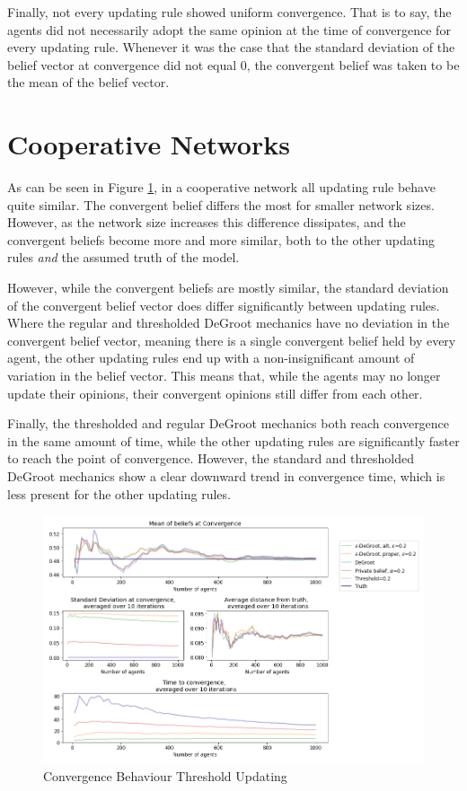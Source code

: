 \documentclass[a4paper, 12pt]{report}
\begin{document}
\noindent Finally, not every updating rule showed uniform convergence. That is to say, the agents did not necessarily adopt the same opinion at the time of convergence for every updating rule. Whenever it was the case that the standard deviation of the belief vector at convergence did not equal $0$, the convergent belief was taken to be the mean of the belief vector.

\section{Cooperative Networks}

As can be seen in Figure \ref{coop:compare}, in a cooperative network all updating rule behave quite similar. The convergent belief differs the most for smaller network sizes. However, as the network size increases this difference dissipates, and the convergent beliefs become more and more similar, both to the other updating rules \emph{and} the assumed truth of the model.

\noindent However, while the convergent beliefs are mostly similar, the standard deviation of the convergent belief vector does differ significantly between updating rules. Where the regular and thresholded DeGroot mechanics have no deviation in the convergent belief vector, meaning there is a single convergent belief held by every agent, the other updating rules end up with a non-insignificant amount of variation in the belief vector. This means that, while the agents may no longer update their opinions, their convergent opinions still differ from each other. 

\noindent Finally, the thresholded and regular DeGroot mechanics both reach convergence in the same amount of time, while the other updating rules are significantly faster to reach the point of convergence. However, the standard and thresholded DeGroot mechanics show a clear downward trend in convergence time, which is less present for the other updating rules.

\begin{center}
    \begin{figure}[!htbp]
        \centering
        \includegraphics[width=1.2\textwidth]{ThesisKI/Images/WisdomCompare0.png}
        \caption{Convergence Behaviour Threshold Updating}
        \label{coop:compare}
    \end{figure}
\end{center}
\end{document}

